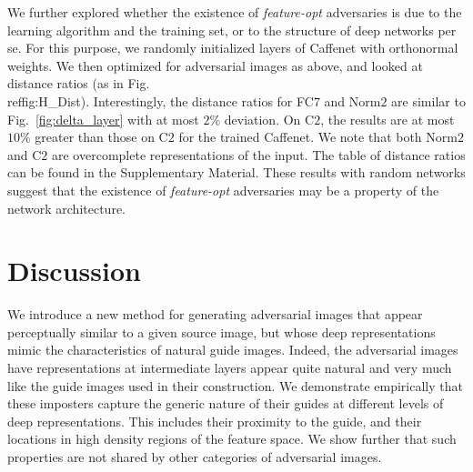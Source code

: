 \documentclass{article} %
\newcommand{\comment}[1]{}
\begin{document}
We further explored whether the existence of {\em feature-opt} adversaries 
is due to the learning algorithm and the training set, or to the structure 
of deep networks per se. For this purpose, we randomly initialized layers of 
Caffenet with orthonormal weights.  We then optimized for adversarial images 
as above, and looked at distance ratios (as in Fig.\\ref{fig:H_Dist}).  
Interestingly, the distance ratios for FC$7$ and Norm$2$ are similar to 
Fig.~\ref{fig:delta_layer} with at most $2\%$ deviation.  On C$2$, the results 
are at most $10\%$ greater than those on C$2$ for the trained Caffenet.  
We note that both Norm$2$ and C$2$ are overcomplete representations 
of the input. The table of distance ratios can be found in the 
Supplementary Material.
These results with random networks suggest that the existence of 
{\em feature-opt} adversaries may be a property of the network architecture.

\comment{This observation shows that the model itself is vulnerable to {\em 
feature-opt} adversaries, rather than just a specific trained network.}%
\section{Discussion}\vspace*{-0.1cm}

We introduce a new method for generating adversarial images that appear 
perceptually similar to a given source image, but whose deep representations 
mimic the characteristics of natural guide images. 
Indeed, the adversarial images have representations at intermediate 
layers appear quite natural and very much like the guide images used 
in their construction.
We demonstrate empirically that these imposters capture the generic 
nature of their guides at different levels of deep representations.  This 
includes their proximity to the guide, and their locations in high density 
regions of the feature space.
We show further that such properties are not shared by other
categories of adversarial images. 
\end{document}
